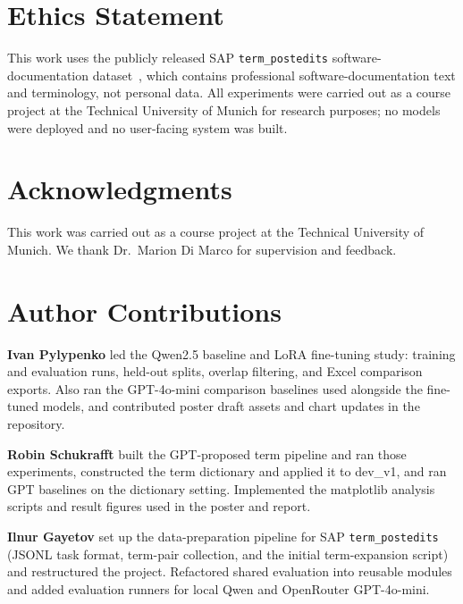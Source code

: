 \documentclass[11pt]{article}
\begin{document}
\section*{Ethics Statement}

This work uses the publicly released SAP \texttt{term\_postedits} software-documentation dataset~\citep{sap2024termpostedits}, which contains professional software-documentation text and terminology, not personal data. All experiments were carried out as a course project at the Technical University of Munich for research purposes; no models were deployed and no user-facing system was built.

\section*{Acknowledgments}

This work was carried out as a course project at the Technical University of Munich. We thank Dr.\ Marion Di Marco for supervision and feedback.

\section*{Author Contributions}

\textbf{Ivan Pylypenko} led the Qwen2.5 baseline and LoRA fine-tuning study: training and evaluation runs, held-out splits, overlap filtering, and Excel comparison exports. Also ran the GPT-4o-mini comparison baselines used alongside the fine-tuned models, and contributed poster draft assets and chart updates in the repository.

\textbf{Robin Schukrafft} built the GPT-proposed term pipeline and ran those experiments, constructed the term dictionary and applied it to dev\_v1, and ran GPT baselines on the dictionary setting. Implemented the matplotlib analysis scripts and result figures used in the poster and report.

\textbf{Ilnur Gayetov} set up the data-preparation pipeline for SAP \texttt{term\_postedits} (JSONL task format, term-pair collection, and the initial term-expansion script) and restructured the project. Refactored shared evaluation into reusable modules and added evaluation runners for local Qwen and OpenRouter GPT-4o-mini.


\end{document}
